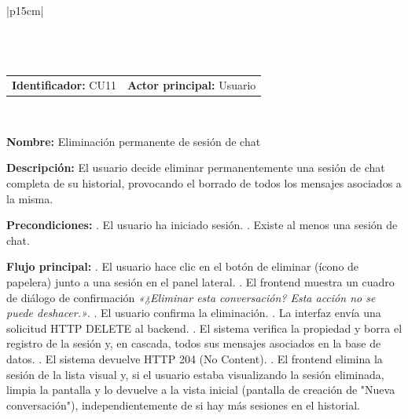 \begingroup
{}
\setlength{\arrayrulewidth}{1pt}
\begin{longtable}{|p{15cm}|}
  \hline
   \\
  \hline
  \endfirsthead
   \\
  \hline
   \\
  \hline
  \endhead
  \hline {} \\ \hline
  \endfoot
  \hline
  \caption{Caso de uso 11 — Eliminación permanente de sesión de chat.}
  \label{TB:CU11_ELIMINAR_SESION}
  \endlastfoot

  \begin{tabularx}{\linewidth}{@{}X X@{}}
    \textbf{Identificador:} CU11 & \textbf{Actor principal:} Usuario
  \end{tabularx} \\ \hline

  \textbf{Nombre:} Eliminación permanente de sesión de chat \\ \hline

  \textbf{Descripción:} \newline 
  El usuario decide eliminar permanentemente una sesión de chat completa de su historial, provocando el borrado de todos los mensajes asociados a la misma. \\ \hline

  \textbf{Precondiciones:} . El usuario ha iniciado sesión. . Existe al menos una sesión de chat. \\ \hline

  \textbf{Flujo principal:} . El usuario hace clic en el botón de eliminar (ícono de papelera) junto a una sesión en el panel lateral. . El frontend muestra un cuadro de diálogo de confirmación \textit{«¿Eliminar esta conversación? Esta acción no se puede deshacer.»}. . El usuario confirma la eliminación. . La interfaz envía una solicitud HTTP DELETE al backend. . El sistema verifica la propiedad y borra el registro de la sesión y, en cascada, todos sus mensajes asociados en la base de datos. . El sistema devuelve HTTP 204 (No Content). . El frontend elimina la sesión de la lista visual y, si el usuario estaba visualizando la sesión eliminada, limpia la pantalla y lo devuelve a la vista inicial (pantalla de creación de "Nueva conversación"), independientemente de si hay más sesiones en el historial. \\ \hline


\end{longtable}
